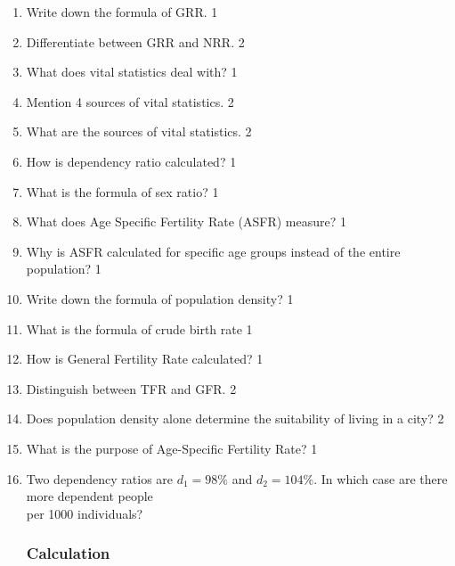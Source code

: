 \documentclass[a4paper,oneside]{book}
\begin{document}
  \begin{enumerate}
  \item Write down the formula of GRR. \hfill 1
  \item Differentiate between GRR and NRR. \hfill 2
  
  \item What does vital statistics deal with? \hfill 1
  
  \item Mention 4 sources of vital statistics. \hfill 2
  
  \item What are the sources of vital statistics. \hfill 2
  
  \item How is dependency ratio calculated? \hfill 1
  
  \item What is the formula of sex ratio? \hfill 1
  
 \item  What does Age Specific Fertility Rate (ASFR) measure? \hfill 1
 \item Why is ASFR calculated for specific age groups instead of the entire population? \hfill 1
  
  \item Write down the formula of population density? \hfill 1
  
  \item What is the formula of crude birth rate \hfill 1
  
  \item How is General Fertility Rate calculated? \hfill 1
  
  \item Distinguish between TFR and GFR. \hfill 2
  
  \item Does population density alone determine the suitability of living in a city? \hfill 2
  
  \item What is the purpose of Age-Specific Fertility Rate? \hfill 1
  
  \item Two dependency ratios are $d_1=98\%$ and $d_2=104\%$. 
  In which case are there more dependent people \\ per 1000 individuals? \hfill 
  
 \subsubsection{Calculation}
 

\end{enumerate}
\end{document}
